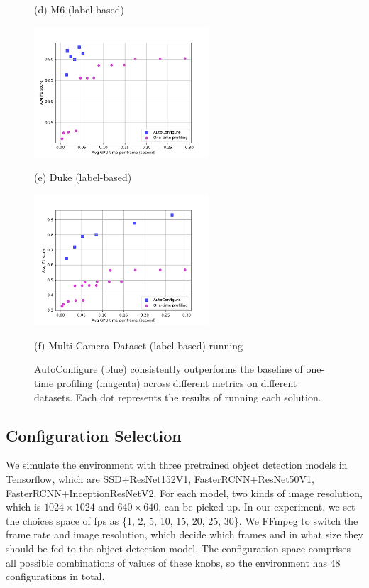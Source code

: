 \begin{figure}[!t]
\begin{minipage}[t]{0.32\linewidth}
		\centerline{(d) M6 (label-based)}
	\end{minipage}
	\hfill
	\begin{minipage}[t]{0.32\linewidth}
		\centerline{\includegraphics[width=6.5cm]{figures/duke_label.pdf}}
		\centerline{(e) Duke (label-based)}
	\end{minipage}
	\hfill
	\begin{minipage}[t]{0.32\linewidth}
		\centerline{\includegraphics[width=6.5cm]{figures/_Westbound_Eastbound_Rear.pdf}}
		\centerline{(f) Multi-Camera Dataset (label-based) \textcolor{note}{running}}
	\end{minipage}		
	\caption{AutoConfigure (blue) consistently outperforms the baseline of one-time profiling (magenta) across different metrics on different datasets. Each dot represents the results of running each solution.}
	\label{fig: results}
\end{figure}

\subsection{Configuration Selection}
\label{subsec: configuration}
We simulate the environment \cite{trade-offs} with three pretrained object detection models in Tensorflow, which are SSD+ResNet152V1, FasterRCNN+ResNet50V1, FasterRCNN+InceptionResNetV2. For each model, two kinds of image resolution, which is $1024\times1024$ and $640\times640$, can be picked up. In our experiment, we set the choices space of fps as \{1, 2, 5, 10, 15, 20, 25, 30\}. We FFmpeg \cite{ffmpeg} to switch the frame rate and image resolution, which decide which frames and in what size they should be fed to the object detection model. The configuration space comprises all possible combinations of values of these knobs, so the environment has 48 configurations in total.

